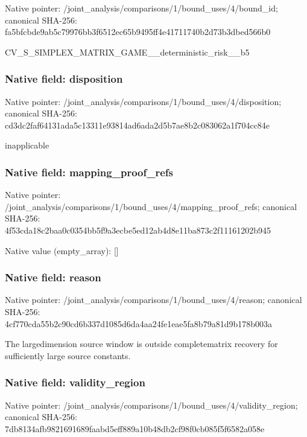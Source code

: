 \documentclass[10pt,a4paper]{article}
\begin{document}
Native pointer: /joint\_analysis/comparis\allowbreak{}ons/1/bound\_uses/4/bound\allowbreak{}\_id; canonical SHA-256: fa5bfcbde9ab5c79976bb3f6\allowbreak{}512ec65b9495ff4e41711740\allowbreak{}b2d73b3dbed566b0


CV\_S\_SIMPLEX\_MATRIX\_GAME\allowbreak{}\_\_deterministic\_risk\_\_b5


\subsubsection{Native field: disposition}


Native pointer: /joint\_analysis/comparis\allowbreak{}ons/1/bound\_uses/4/dispo\allowbreak{}sition; canonical SHA-256: cd3dc2faf64131ada5c13311\allowbreak{}e93814ad6ada2d5b7ae8b2c0\allowbreak{}83062a1f704cc84e


inapplicable


\subsubsection{Native field: mapping\_proof\_refs}


Native pointer: /joint\_analysis/comparis\allowbreak{}ons/1/bound\_uses/4/mappi\allowbreak{}ng\_proof\_refs; canonical SHA-256: 4f53cda18c2baa0c0354bb5f\allowbreak{}9a3ecbe5ed12ab4d8e11ba87\allowbreak{}3c2f11161202b945



Native value (empty\_array): []



\subsubsection{Native field: reason}


Native pointer: /joint\_analysis/comparis\allowbreak{}ons/1/bound\_uses/4/reaso\allowbreak{}n; canonical SHA-256: 4cf770cda55b2c90cd6b337d\allowbreak{}1085d6da4aa24fe1eae5fa8b\allowbreak{}79a81d9b178b003a


The largedimension source window is outside completematrix recovery for sufficiently large source constants.


\subsubsection{Native field: validity\_region}


Native pointer: /joint\_analysis/comparis\allowbreak{}ons/1/bound\_uses/4/valid\allowbreak{}ity\_region; canonical SHA-256: 7db8134afb9821691689faab\allowbreak{}d5eff889a10b48db2cf98f0c\allowbreak{}b085f5f6582a058e
\end{document}
